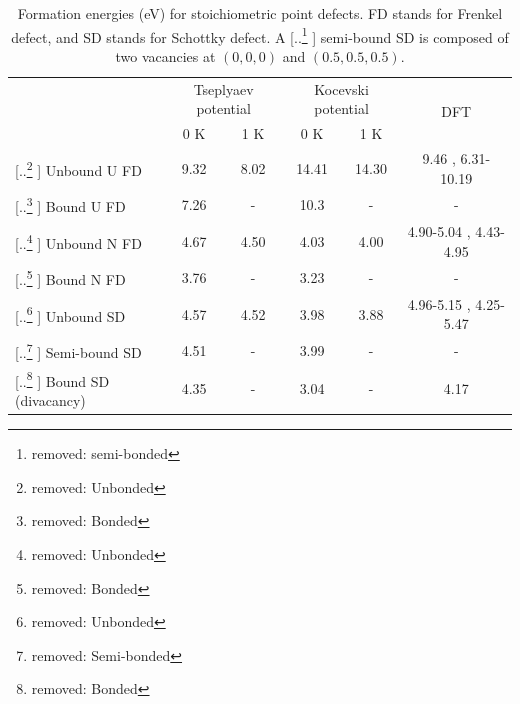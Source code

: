 \documentclass[preprint, 12pt]{elsarticle}
\providecommand{\DIFaddtex}[1]{{\protect\color{blue} \sf #1}} %
\providecommand{\DIFdeltex}[1]{{\protect\color{red} [..\footnote{removed: #1} ]}} %
\providecommand{\DIFaddFL}[1]{\DIFadd{#1}} %
\providecommand{\DIFdelFL}[1]{\DIFdel{#1}} %
\providecommand{\DIFaddbeginFL}{} %
\providecommand{\DIFaddendFL}{} %
\providecommand{\DIFdelbeginFL}{} %
\providecommand{\DIFdelendFL}{} %
\providecommand{\DIFadd}[1]{\texorpdfstring{\DIFaddtex{#1}}{#1}} %
\providecommand{\DIFdel}[1]{\texorpdfstring{\DIFdeltex{#1}}{}} %
\newcommand{\DIFscaledelfig}{0.5}
\newlength{\DIFdelgraphicswidth} %
\newlength{\DIFdelgraphicsheight} %
\newcommand{\DIFaddincludegraphics}[2][]{{\color{blue}\fbox{\DIFOincludegraphics[#1]{#2}}}} %
\newcommand{\DIFdelincludegraphics}[2][]{%
\sbox{\DIFdelgraphicsbox}{\DIFOincludegraphics[#1]{#2}}%
\settoboxwidth{\DIFdelgraphicswidth}{\DIFdelgraphicsbox} %
\settoboxtotalheight{\DIFdelgraphicsheight}{\DIFdelgraphicsbox} %
\scalebox{\DIFscaledelfig}{%
\parbox[b]{\DIFdelgraphicswidth}{\usebox{\DIFdelgraphicsbox}\\[-\baselineskip] \rule{\DIFdelgraphicswidth}{0em}}\llap{\resizebox{\DIFdelgraphicswidth}{\DIFdelgraphicsheight}{%
\setlength{\unitlength}{\DIFdelgraphicswidth}%
\begin{picture}(1,1)%
\thicklines\linethickness{2pt} %
{\color[rgb]{1,0,0}\put(0,0){\framebox(1,1){}}}%
{\color[rgb]{1,0,0}\put(0,0){\line( 1,1){1}}}%
{\color[rgb]{1,0,0}\put(0,1){\line(1,-1){1}}}%
\end{picture}%
}\hspace*{3pt}}} %
} %
\DeclareRobustCommand{\DIFaddbeginFL}{\DIFOaddbeginFL \let\includegraphics\DIFaddincludegraphics} %
\DeclareRobustCommand{\DIFaddendFL}{\DIFOaddendFL \let\includegraphics\DIFOincludegraphics} %
\DeclareRobustCommand{\DIFdelbeginFL}{\DIFOdelbeginFL \let\includegraphics\DIFdelincludegraphics} %
\DeclareRobustCommand{\DIFdelendFL}{\DIFOaddendFL \let\includegraphics\DIFOincludegraphics} %
\begin{document}
\begin{table}[h!]
    \centering
    \footnotesize
    \caption{Formation energies (eV) for stoichiometric point defects. FD stands for Frenkel defect, and SD stands for Schottky defect. A \DIFdelbeginFL \DIFdelFL{semi-bonded }\DIFdelendFL \DIFaddbeginFL \DIFaddFL{semi-bound }\DIFaddendFL SD is composed of two vacancies at $(0, 0, 0)$ and $(0.5, 0.5, 0.5)$.}
    \label{Tab:StoicDef}
    \begin{tabular}{l|cc|cc|c}
    \hline
                & \multicolumn{2}{c|}{Tseplyaev potential}            & \multicolumn{2}{c|}{Kocevski potential}  & \multirow{2}{*}{DFT} \\
& 0 K & 1 K & 0 K & 1 K & \\
\hline
\DIFdelbeginFL \DIFdelFL{Unbonded }\DIFdelendFL \DIFaddbeginFL \DIFaddFL{Unbound }\DIFaddendFL U FD            & 9.32   & 8.02            & 14.41  & 14.30 & 9.46 \cite{Yang2021}, 6.31-10.19 \cite{Kocevski2022I} \\
\DIFdelbeginFL \DIFdelFL{Bonded }\DIFdelendFL \DIFaddbeginFL \DIFaddFL{Bound }\DIFaddendFL U FD              & 7.26   & -               & 10.3   & -     & - \\
\DIFdelbeginFL \DIFdelFL{Unbonded }\DIFdelendFL \DIFaddbeginFL \DIFaddFL{Unbound }\DIFaddendFL N FD            & 4.67   & 4.50            & 4.03   & 4.00  & 4.90-5.04 \cite{Yang2021}, 4.43-4.95 \cite{Kocevski2022I} \\
\DIFdelbeginFL \DIFdelFL{Bonded }\DIFdelendFL \DIFaddbeginFL \DIFaddFL{Bound }\DIFaddendFL N FD              & 3.76   & -               & 3.23   & -     & - \\
\DIFdelbeginFL \DIFdelFL{Unbonded }\DIFdelendFL \DIFaddbeginFL \DIFaddFL{Unbound }\DIFaddendFL SD              & 4.57   & 4.52            & 3.98   & 3.88  & 4.96-5.15 \cite{Yang2021}, 4.25-5.47 \cite{Kocevski2022I} \\
\DIFdelbeginFL \DIFdelFL{Semi-bonded }\DIFdelendFL \DIFaddbeginFL \DIFaddFL{Semi-bound }\DIFaddendFL SD           & 4.51   & -               & 3.99   & -     & - \\
\DIFdelbeginFL \DIFdelFL{Bonded }\DIFdelendFL \DIFaddbeginFL \DIFaddFL{Bound }\DIFaddendFL SD (divacancy)    & 4.35   & -               & 3.04   & -     & 4.17 \cite{Yang2021} \\
    \hline
    \end{tabular}
\end{table}
\end{document}
